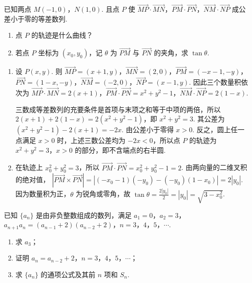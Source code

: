 \begin{problem}
已知两点 \(M(-1,0)\)，\(N(1,0)\). 且点 \(P\) 使 \(\overrightarrow{MP} \cdot \overrightarrow{MN}\)，\(\overrightarrow{PM} \cdot \overrightarrow{PN}\)，\(\overrightarrow{NM} \cdot \overrightarrow{NP}\) 成公差小于零的等差数列.

\begin{enumerate}
\item 点 \(P\) 的轨迹是什么曲线？
\item 若点 \(P\) 坐标为 \((x_0, y_0)\)，记 \(\theta\) 为 \(\overrightarrow{PM}\) 与 \(\overrightarrow{PN}\) 的夹角，求 \(\tan \theta\).
\end{enumerate}
\end{problem}

\begin{solution}
\begin{enumerate}
\item 设 \(P(x,y)\). 则
\(\overrightarrow{MP}=(x+1,y)\)，\(\overrightarrow{MN}=(2,0)\)，\(\overrightarrow{PM}=(-x-1,-y)\)，\(\overrightarrow{PN}=(1-x,-y)\)，\(\overrightarrow{NM}=(-2,0)\)，\(\overrightarrow{NP}=(x-1,y)\). 因此三个数量积依次为
\(\overrightarrow{MP}\cdot\overrightarrow{MN}=2(x+1)\)，\(\overrightarrow{PM}\cdot\overrightarrow{PN}=x^{2}+y^{2}-1\)，\(\overrightarrow{NM}\cdot\overrightarrow{NP}=2(1-x)\).

三数成等差数列的充要条件是首项与末项之和等于中项的两倍，所以
\(2(x+1)+2(1-x)=2(x^{2}+y^{2}-1)\)，即 \(x^{2}+y^{2}=3\). 其公差为
\((x^{2}+y^{2}-1)-2(x+1)=-2x\). 由公差小于零得 \(x>0\). 反之，圆上任一点满足 \(x>0\) 时，上述三数公差均为 \(-2x<0\)，所以点 \(P\) 的轨迹为 \(x^{2}+y^{2}=3\)，\(x>0\) 的部分，即不含端点的右半圆.
\item 在轨迹上 \(x_{0}^{2}+y_{0}^{2}=3\)，所以
\(\overrightarrow{PM}\cdot\overrightarrow{PN}=x_{0}^{2}+y_{0}^{2}-1=2\). 由两向量的二维叉积的绝对值，
\(\left|\overrightarrow{PM}\times\overrightarrow{PN}\right|=\left|(-x_{0}-1)(-y_{0})-(-y_{0})(1-x_{0})\right|=2|y_{0}|\). 因为数量积为正，\(\theta\) 为锐角或零角，故
\(\tan\theta=\frac{2|y_{0}|}{2}=|y_{0}|=\sqrt{3-x_{0}^{2}}\).
\end{enumerate}
\end{solution}

\begin{problem}
已知 \(\{a_{n}\}\) 是由非负整数组成的数列，满足 \(a_{1} = 0\)，\(a_{2} = 3\)，\(a_{n+1}a_{n} = (a_{n-1} + 2)(a_{n-2} + 2)\)，\(n = 3\)，\(4\)，\(5\)，\(\cdots\).

\begin{enumerate}
\item 求 \(a_{3}\)；
\item 证明 \(a_{n} = a_{n - 2} + 2\)，\(n = 3\)，\(4\)，\(5\)，\(\cdots\)；
\item 求 \(\{a_{n}\}\) 的通项公式及其前 \(n\) 项和 \(S_{n}\).
\end{enumerate}
\end{problem}

